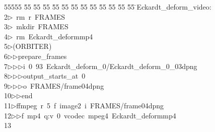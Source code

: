 %
%
\begin{tabbing}
55555 \= 55 \= 55 \= 55 \= 55 \= 55 \= 55 \= 55 \= 55 \= 55 \= 55 \= 55 \= 55 \= \>Eckardt\_deform\_video:\\[0pt]
2\>$\triangleright$\>\ rm\ r\ FRAMES\\[0pt]
3\>$\triangleright$\>\ mkdir\ FRAMES\\[0pt]
4\>$\triangleright$\>\ rm\ Eckardt\_deformmp4\\[0pt]
5\>$\triangleright$\>(ORBITER)\ \\[0pt]
6\>$\triangleright$\>$\triangleright$\>prepare\_frames\ \\[0pt]
7\>$\triangleright$\>$\triangleright$\>$\triangleright$\>i\ 0\ 93\ Eckardt\_deform\_0/Eckardt\_deform\_0\_03dpng\ \\[0pt]
8\>$\triangleright$\>$\triangleright$\>$\triangleright$\>output\_starts\_at\ 0\ \\[0pt]
9\>$\triangleright$\>$\triangleright$\>$\triangleright$\>o\ FRAMES/frame04dpng\ \\[0pt]
10\>$\triangleright$\>$\triangleright$\>end\\[0pt]
11\>$\triangleright$\>ffmpeg\ r\ 5\ f\ image2\ i\ FRAMES/frame04dpng\ \\[0pt]
12\>$\triangleright$\>$\triangleright$\>f\ mp4\ q:v\ 0\ vcodec\ mpeg4\ Eckardt\_deformmp4\\[0pt]
13\>\end{tabbing}
